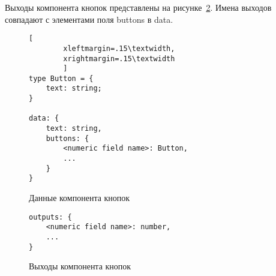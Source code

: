 Выходы компонента кнопок представлены на рисунке~\ref{f:button-component-outputs}.
Имена выходов совпадают с элементами поля buttons в data.

\begin{figure}[ht]
	\centering
	\vspace{\toppaddingoffigure}
	\begin{lstlisting}[
        xleftmargin=.15\textwidth,
        xrightmargin=.15\textwidth
        ]
type Button = {
    text: string;
}

data: {
    text: string,
    buttons: {
        <numeric field name>: Button,
        ...
    }
}
    \end{lstlisting}
	\caption{Данные компонента кнопок}
	\label{f:button-component-data}
\end{figure}

\begin{figure}[!ht]
	\centering
	\vspace{\toppaddingoffigure}
	\begin{lstlisting}
outputs: {
    <numeric field name>: number,
    ...
}
    \end{lstlisting}
	\caption{Выходы компонента кнопок}
	\label{f:button-component-outputs}
\end{figure}

\newpage


